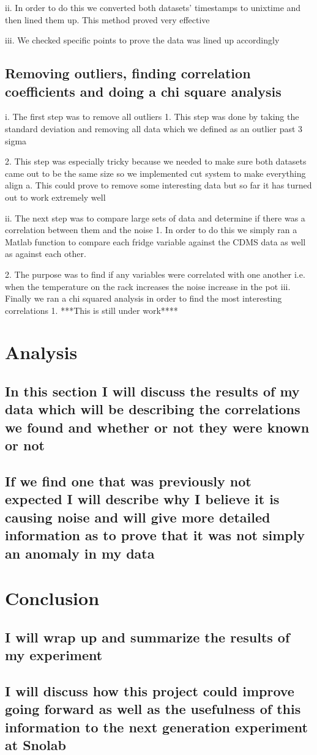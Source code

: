 ii.	In order to do this we converted both datasets’ timestamps to unixtime and then lined them up. This method proved very effective

iii.	We checked specific points to prove the data was lined up accordingly

\subsection{Removing outliers, finding correlation coefficients and doing a chi square analysis}
i.	The first step was to remove all outliers
1.	This step was done by taking the standard deviation and removing all data which we defined as an outlier past 3 sigma

2.	This step was especially tricky because we needed to make sure both datasets came out to be the same size so we implemented cut system to make everything align
a.	This could prove to remove some interesting data but so far it has turned out to work extremely well

ii.	The next step was to compare large sets of data and determine if there was a correlation between them and the noise
1.	In order to do this we simply ran a Matlab function to compare each fridge variable against the CDMS data as well as against each other.

2.	The purpose was to find if any variables were correlated with one another i.e. when the temperature on the rack increases the noise increase in the pot
iii.	Finally we ran a chi squared analysis in order to find the most interesting correlations
1.	***This is still under work****
\section{Analysis}
\subsection{In this section I will discuss the results of my data which will be describing the correlations we found and whether or not they were known or not}
\subsection{If we find one that was previously not expected I will describe why I believe it is causing noise and will give more detailed information as to prove that it was not simply an anomaly in my data}
\section{Conclusion}
\subsection{I will wrap up and summarize the results of my experiment}

\subsection{I will discuss how this project could improve going forward as well as the usefulness of this information to the next generation experiment at Snolab}
